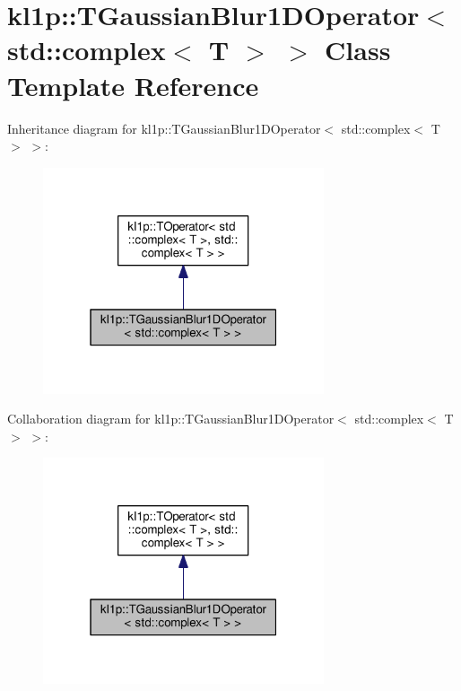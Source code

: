 \hypertarget{classkl1p_1_1TGaussianBlur1DOperator_3_01std_1_1complex_3_01T_01_4_01_4}{}\section{kl1p\+:\+:T\+Gaussian\+Blur1\+D\+Operator$<$ std\+:\+:complex$<$ T $>$ $>$ Class Template Reference}
\label{classkl1p_1_1TGaussianBlur1DOperator_3_01std_1_1complex_3_01T_01_4_01_4}


Inheritance diagram for kl1p\+:\+:T\+Gaussian\+Blur1\+D\+Operator$<$ std\+:\+:complex$<$ T $>$ $>$\+:
\nopagebreak
\begin{figure}[H]
\begin{center}
\leavevmode
\includegraphics[width=235pt]{classkl1p_1_1TGaussianBlur1DOperator_3_01std_1_1complex_3_01T_01_4_01_4__inherit__graph}
\end{center}
\end{figure}


Collaboration diagram for kl1p\+:\+:T\+Gaussian\+Blur1\+D\+Operator$<$ std\+:\+:complex$<$ T $>$ $>$\+:
\nopagebreak
\begin{figure}[H]
\begin{center}
\leavevmode
\includegraphics[width=235pt]{classkl1p_1_1TGaussianBlur1DOperator_3_01std_1_1complex_3_01T_01_4_01_4__coll__graph}
\end{center}
\end{figure}
